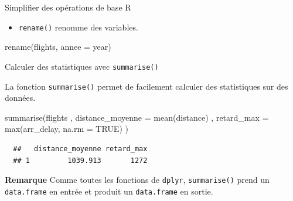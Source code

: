 \documentclass[12pt,ignorenonframetext,]{beamer}
\newenvironment{Shaded}{}{}
\newcommand{\DataTypeTok}[1]{#1}
\newcommand{\KeywordTok}[1]{\textcolor[rgb]{0.00,0.00,1.00}{#1}}
\newcommand{\NormalTok}[1]{#1}
\newcommand{\OtherTok}[1]{\textcolor[rgb]{1.00,0.25,0.00}{#1}}
\providecommand{\tightlist}{%
  \setlength{\itemsep}{0pt}\setlength{\parskip}{0pt}}
\renewenvironment{Shaded}{\begin{snugshade}}{\end{snugshade}}
\newcommand{\intertitre}[1]{\textcolor{redInsee}{\textbf{#1}}}
\begin{document}
\begin{frame}[fragile]{Simplifier des opérations de base R}
\pause \vspace{-3mm}

\begin{itemize}
\tightlist
\item
  \texttt{rename()} renomme des variables.
\end{itemize}

\vspace{-3mm}

\begin{Shaded}
\begin{Highlighting}[]
\KeywordTok{rename}\NormalTok{(flights, }\DataTypeTok{annee =}\NormalTok{ year)}
\end{Highlighting}
\end{Shaded}

\end{frame}

\begin{frame}[fragile]{Calculer des statistiques avec
\texttt{summarise()}}
\protect\hypertarget{calculer-des-statistiques-avec-summarise}{}

La fonction \texttt{summarise()} permet de facilement calculer des
statistiques sur des données.

\pause

\begin{Shaded}
\begin{Highlighting}[]
\KeywordTok{summarise}\NormalTok{(flights}
\NormalTok{  , }\DataTypeTok{distance_moyenne =} \KeywordTok{mean}\NormalTok{(distance)}
\NormalTok{  , }\DataTypeTok{retard_max =} \KeywordTok{max}\NormalTok{(arr_delay, }\DataTypeTok{na.rm =} \OtherTok{TRUE}\NormalTok{)}
\NormalTok{)}
\end{Highlighting}
\end{Shaded}

\begin{verbatim}
  ##   distance_moyenne retard_max
  ## 1         1039.913       1272
\end{verbatim}

\pause

\intertitre{Remarque} Comme toutes les fonctions de \texttt{dplyr},
\texttt{summarise()} prend un \texttt{data.frame} en entrée et produit
un \texttt{data.frame} en sortie.

\end{frame}
\end{document}
